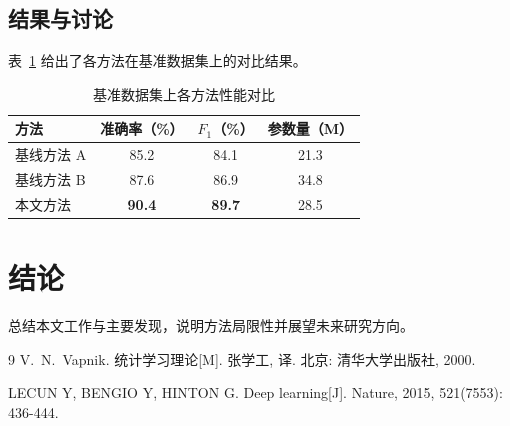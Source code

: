 \documentclass[
  UTF8,
  fontset=fandol,        %
  zihao=-4,              %
  a4paper,
]{ctexart}
\begin{document}
\subsection{结果与讨论}
表~\ref{tab:results} 给出了各方法在基准数据集上的对比结果。

\begin{table}[!htbp]
  \centering
  \caption{基准数据集上各方法性能对比}
  \label{tab:results}
  \begin{tabular}{lccc}
    \toprule
    方法 & 准确率（\%） & $F_1$（\%） & 参数量（M） \\
    \midrule
    基线方法 A & 85.2 & 84.1 & 21.3 \\
    基线方法 B & 87.6 & 86.9 & 34.8 \\
    本文方法   & \textbf{90.4} & \textbf{89.7} & 28.5 \\
    \bottomrule
  \end{tabular}
\end{table}


\section{结论}
总结本文工作与主要发现，说明方法局限性并展望未来研究方向。

\begin{thebibliography}{9}
V.~N.~Vapnik. 统计学习理论[M]. 张学工, 译. 北京: 清华大学出版社, 2000.

LECUN Y, BENGIO Y, HINTON G. Deep learning[J]. Nature, 2015,
521(7553): 436-444.
\end{thebibliography}
\end{document}
